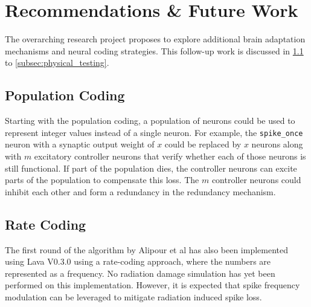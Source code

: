 \section{Recommendations \& Future Work}\label{sec:recommendations}

The overarching research project proposes to explore additional brain adaptation mechanisms and neural coding strategies. This follow-up work is discussed in \cref{subsec:population_coding} to  \cref{subsec:physical_testing}. 
\subsection{Population Coding}\label{subsec:population_coding}
Starting with the population coding, a population of neurons could be used to represent integer values instead of a single neuron. For example, the \verb+spike_once+ neuron with a synaptic output weight of $x$ could be replaced by $x$ neurons along with $m$ excitatory controller neurons that verify whether each of those neurons is still functional. If part of the population dies, the controller neurons can excite parts of the population to compensate this loss. The $m$ controller neurons could inhibit each other and form a redundancy in the redundancy mechanism.

\subsection{Rate Coding}\label{subsec:rate_coding}
The first round of the algorithm by Alipour et al has also been implemented using Lava V0.3.0 using a rate-coding approach, where the numbers are represented as a frequency. No radiation damage simulation has yet been performed on this implementation. However, it is expected that spike frequency modulation can be leveraged to mitigate radiation induced spike loss.


